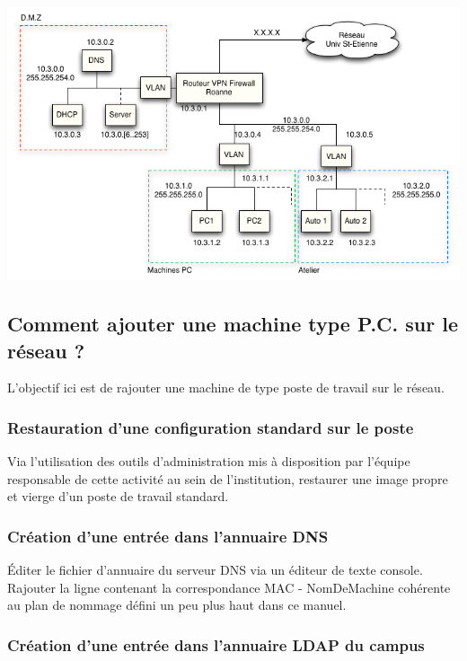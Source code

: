 \documentclass[a4paper]{article}
\begin{document}
\begin{center}
\includegraphics[scale=0.6]{SiteRoanne.png}
\end{center}

\subsection{Comment ajouter une machine type P.C. sur le réseau ?}

L'objectif ici est de rajouter une machine de type poste de travail sur le réseau.

\subsubsection{Restauration d'une configuration standard sur le poste}

Via l'utilisation des outils d'administration mis à disposition par l'équipe responsable de cette activité au sein de l'institution, restaurer une image propre et vierge d'un poste de travail standard.

\subsubsection{Création d'une entrée dans l'annuaire DNS}

Éditer le fichier d'annuaire du serveur DNS via un éditeur de texte console.
Rajouter la ligne contenant la correspondance MAC - NomDeMachine cohérente au plan de nommage défini un peu plus haut dans ce 
manuel.

\subsubsection{Création d'une entrée dans l'annuaire LDAP du campus}
\end{document}
